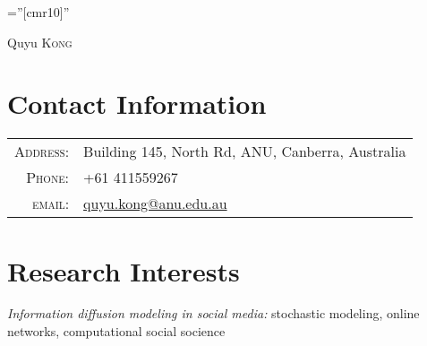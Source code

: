 \documentclass[a4paper,10pt]{article}
\begin{document}
\pagestyle{empty} %

\font\fb=''[cmr10]'' %

\par{\centering
		{\Huge Quyu \textsc{Kong}
	}\bigskip\par}

\section{Contact Information}

\begin{tabular}{rl}
    \textsc{Address:}   & Building 145, North Rd, ANU, Canberra, Australia \\
    \textsc{Phone:}     & +61 411559267\\
    \textsc{email:}     & \href{mailto:quyu.kong@anu.edu.au}{quyu.kong@anu.edu.au}
\end{tabular}

\section{Research Interests}
\textit{Information diffusion modeling in social media:} stochastic modeling, online networks, computational social socience
\end{document}
